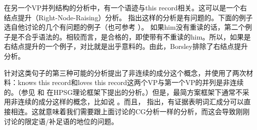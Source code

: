 在另一个VP并列结构的分析中，有一个语迹与this record相关。这可以是一个右结点提升（Right-Node-Raising）分析。 \citet{Borsley2005a}指出这样的分析是有问题的。下面的例子选自他讨论的几个有问题的例子（也可参考 \citet[]{Bresnan74a-u}）。
\eal
{}
\zl
如果him没有重读的话，第二个例子是不合乎语法的。相较而言，是合格的，即使带有不重读的him。所以，如果是右结点提升的一个例子，对比就是出乎意料的。由此，Borsley排除了右结点提升分析。

针对这类句子的第三种可能的分析提出了非连续的成分这个概念，并使用了两次材料：knows this record和loves this record这两个VP与第一个VP的并列是非连续的。（参见 和 在HPSG理论框架下提出的分析。）但是，最简方案框架下通常不采用非连续的成分这样的概念，比如说 。而且， \citet{Abeille2006a}指出，有证据表明词汇成分可以直接相连。这就意味着我们需要跟上面讨论的CG分析一样的分析，而这会导致刚刚讨论的限定语/补足语的地位的问题。

